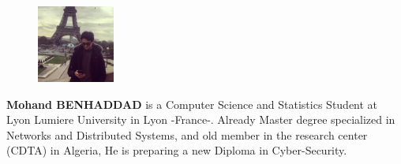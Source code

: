 \documentclass[times, twoside]{zHenriquesLab-StyleBioRxiv}
\begin{document}
 \begin{figure}
  \begin{center}
    \includegraphics[width=1in, hight=1.50in,clip]{Figures/Mohand.JPG}
      \end{center}
\end{figure}\par
  \textbf{Mohand BENHADDAD} is a Computer Science and Statistics Student at Lyon Lumiere University in Lyon -France-. Already Master degree specialized in Networks and Distributed Systems, and old member in the research center (CDTA) in Algeria, He is preparing a new Diploma in Cyber-Security.


\newpage
\null
\newpage


\end{document}
